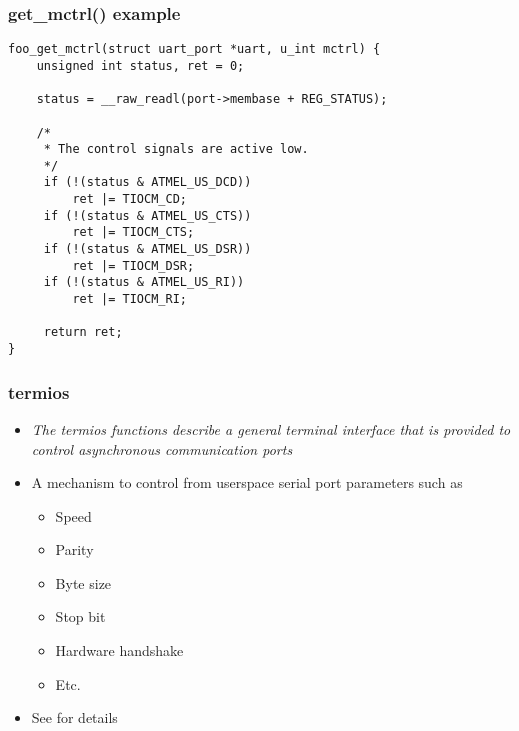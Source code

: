 \begin{frame}[fragile]
\frametitle{get\_mctrl() example}
\begin{verbatim}
foo_get_mctrl(struct uart_port *uart, u_int mctrl) {
    unsigned int status, ret = 0;

    status = __raw_readl(port->membase + REG_STATUS);

    /*
     * The control signals are active low.
     */
     if (!(status & ATMEL_US_DCD))
         ret |= TIOCM_CD;
     if (!(status & ATMEL_US_CTS))
         ret |= TIOCM_CTS;
     if (!(status & ATMEL_US_DSR))
         ret |= TIOCM_DSR;
     if (!(status & ATMEL_US_RI))
         ret |= TIOCM_RI;

     return ret;
}
\end{verbatim}
\end{frame}

\begin{frame}
  \frametitle{termios}
  \begin{itemize}
  \item \emph{The termios functions describe a general terminal
      interface that is provided to control asynchronous
      communication ports}
  \item A mechanism to control from userspace serial port parameters
    such as
    \begin{itemize}
    \item Speed
    \item Parity
    \item Byte size
    \item Stop bit
    \item Hardware handshake
    \item Etc.
    \end{itemize}
  \item See  for details
  \end{itemize}
\end{frame}

